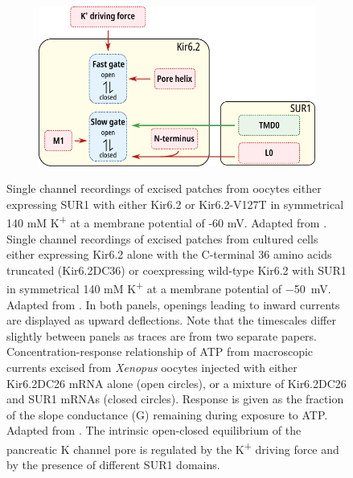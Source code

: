 \begin{figure}[hbtp]
\begin{subfigure}[t]{0.45\textwidth}
	\end{subfigure}
	\hfill
	\begin{subfigure}[t]{0.45\textwidth}
		\caption{}\label{ch1fig:intrinsic_diagram}
		\centering
		\includegraphics[width=\textwidth]{regulation_diagram_2.pdf}
	\end{subfigure}
	\caption[Intrinsic regulation of Kir6.2 gating]{
		{\bf{}}
		 Single channel recordings of excised patches from oocytes either expressing SUR1 with either Kir6.2 or Kir6.2-V127T in symmetrical 140 mM K\textsuperscript{+} at a membrane potential of -60 mV.
		Adapted from \textcite{proks_mutations_2001}.
		 Single channel recordings of excised patches from cultured cells either expressing Kir6.2 alone with the C-terminal 36 amino acids truncated (Kir6.2\textgreek{D}C36) or coexpressing wild-type Kir6.2 with SUR1 in symmetrical 140 mM K\textsuperscript{+} at a membrane potential of \SI{-50}{\milli\volt}.
		Adapted from \textcite{enkvetchakul_kinetic_2000-1}.
		In both panels, openings leading to inward currents are displayed as upward deflections.
		Note that the timescales differ slightly between panels as traces are from two separate papers.
		 Concentration-response relationship of ATP from macroscopic currents excised from \textit{Xenopus} oocytes injected with either Kir6.2\textgreek{D}C26 mRNA alone (open circles), or a mixture of Kir6.2\textgreek{D}C26 and SUR1 mRNAs (closed circles).
		Response is given as the fraction of the slope conductance (G) remaining during exposure to ATP.
		Adapted from \textcite{tucker_truncation_1997}.
		 The intrinsic open-closed equilibrium of the pancreatic K\ATP{} channel pore is regulated by the K\textsuperscript{+} driving force and by the presence of different SUR1 domains.
	}
\end{figure}


